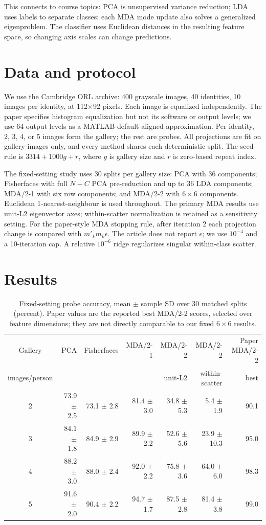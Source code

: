 \documentclass[10pt]{article}
\begin{document}
This connects to course topics: PCA is unsupervised variance reduction; LDA uses labels to separate classes; each MDA mode update also solves a generalized eigenproblem. The classifier uses Euclidean distances in the resulting feature space, so changing axis scales can change predictions.

\section{Data and protocol}
We use the Cambridge ORL archive: 400 grayscale images, 40 identities, 10 images per identity, at 112$\times$92 pixels. Each image is equalized independently. The paper specifies histogram equalization but not its software or output levels; we use 64 output levels as a MATLAB-default-aligned approximation. Per identity, 2, 3, 4, or 5 images form the gallery; the rest are probes. All projections are fit on gallery images only, and every method shares each deterministic split. The seed rule is $3314+1000g+r$, where $g$ is gallery size and $r$ is zero-based repeat index.

The fixed-setting study uses 30 splits per gallery size: PCA with 36 components; Fisherfaces with full $N-C$ PCA pre-reduction and up to 36 LDA components; MDA/2-1 with six row components; and MDA/2-2 with $6\times6$ components. Euclidean 1-nearest-neighbour is used throughout. The primary MDA results use unit-L2 eigenvector axes; within-scatter normalization is retained as a sensitivity setting. For the paper-style MDA stopping rule, after iteration 2 each projection change is compared with $m'_k m_k\epsilon$. The article does not report $\epsilon$; we use $10^{-4}$ and a 10-iteration cap. A relative $10^{-6}$ ridge regularizes singular within-class scatter.

\section{Results}
\begin{table}[h]
\centering
\small
\caption{Fixed-setting probe accuracy, mean $\pm$ sample SD over 30 matched splits (percent). Paper values are the reported best MDA/2-2 scores, selected over feature dimensions; they are not directly comparable to our fixed $6\times6$ results.}
\begin{tabular}{crrrrrr}
\toprule
Gallery & PCA & Fisherfaces & MDA/2-1 & MDA/2-2 & MDA/2-2 & Paper MDA/2-2\\
images/person & & & & unit-L2 & within-scatter & best\\
\midrule
2 & 73.9 $\pm$ 2.5 & 73.1 $\pm$ 2.8 & 81.4 $\pm$ 3.0 & 34.8 $\pm$ 5.3 & 5.4 $\pm$ 1.9 & 90.1\\
3 & 84.1 $\pm$ 1.8 & 84.9 $\pm$ 2.9 & 89.9 $\pm$ 2.2 & 52.6 $\pm$ 5.6 & 23.9 $\pm$ 10.3 & 95.0\\
4 & 88.2 $\pm$ 3.0 & 88.0 $\pm$ 2.4 & 92.0 $\pm$ 2.2 & 75.8 $\pm$ 3.6 & 64.0 $\pm$ 6.0 & 98.3\\
5 & 91.6 $\pm$ 2.0 & 90.4 $\pm$ 2.2 & 94.7 $\pm$ 1.7 & 87.5 $\pm$ 2.8 & 81.4 $\pm$ 3.8 & 99.0\\
\bottomrule
\end{tabular}
\end{table}
\end{document}
